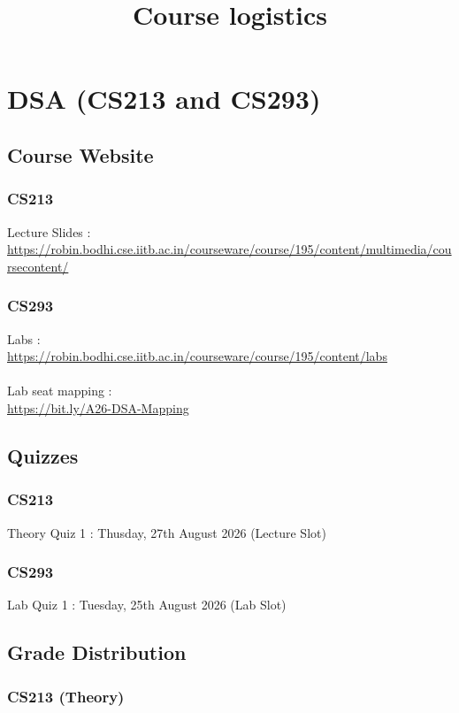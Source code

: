 \documentclass{article}
\title{Course logistics}
\date{}
\begin{document}
\maketitle


\section{DSA (CS213 and CS293)}

    \subsection{Course Website}

        \subsubsection{CS213}
        Lecture Slides : \\\url{https://robin.bodhi.cse.iitb.ac.in/courseware/course/195/content/multimedia/coursecontent/}

        \subsubsection{CS293}
        Labs : \\
        \url{https://robin.bodhi.cse.iitb.ac.in/courseware/course/195/content/labs}
        \\\\
        Lab seat mapping : \\\url{https://bit.ly/A26-DSA-Mapping}
    \subsection{Quizzes}

        \subsubsection{CS213}
        Theory Quiz 1 : Thusday, 27th August 2026 (Lecture Slot)
        \subsubsection{CS293}
        Lab Quiz 1 : Tuesday, 25th August 2026 (Lab Slot)
    \subsection{Grade Distribution}

        \subsubsection{CS213 (Theory)}
\end{document}
